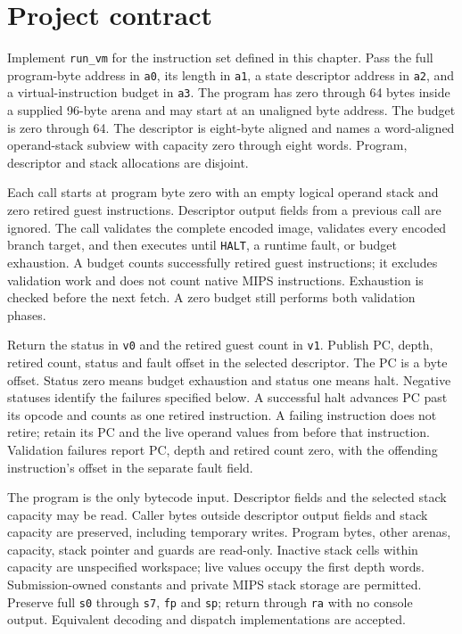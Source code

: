 \section*{Project contract}
Implement \texttt{run\_vm} for the instruction set defined in this chapter. Pass
the full program-byte address in \texttt{a0}, its length in \texttt{a1}, a state
descriptor address in \texttt{a2}, and a virtual-instruction budget in \texttt{a3}.
The program has zero through 64 bytes inside a supplied 96-byte arena and may start
at an unaligned byte address. The budget is zero through 64. The descriptor is
eight-byte aligned and names a word-aligned operand-stack subview with capacity zero
through eight words. Program, descriptor and stack allocations are disjoint.

Each call starts at program byte zero with an empty logical operand stack and zero
retired guest instructions. Descriptor output fields from a previous call are ignored.
The call validates the complete encoded image, validates every encoded branch target,
and then executes until \texttt{HALT}, a runtime fault, or budget exhaustion. A
budget counts successfully retired guest instructions; it excludes validation work
and does not count native MIPS instructions. Exhaustion is checked before the next
fetch. A zero budget still performs both validation phases.

Return the status in \texttt{v0} and the retired guest count in \texttt{v1}. Publish
PC, depth, retired count, status and fault offset in the selected descriptor. The PC
is a byte offset. Status zero means budget exhaustion and status one means halt.
Negative statuses identify the failures specified below. A successful halt advances
PC past its opcode and counts as one retired instruction. A failing instruction does
not retire; retain its PC and the live operand values from before that instruction.
Validation failures report PC, depth and retired count zero, with the offending
instruction's offset in the separate fault field.

The program is the only bytecode input. Descriptor fields and the selected stack
capacity may be read. Caller bytes outside descriptor output fields and stack capacity
are preserved, including temporary writes. Program bytes, other arenas, capacity,
stack pointer and guards are read-only. Inactive stack cells within capacity are
unspecified workspace; live values occupy the first depth words. Submission-owned
constants and private MIPS stack storage are permitted. Preserve full \texttt{s0} through \texttt{s7}, \texttt{fp} and \texttt{sp};
return through \texttt{ra} with no console output. Equivalent decoding and dispatch
implementations are accepted.
